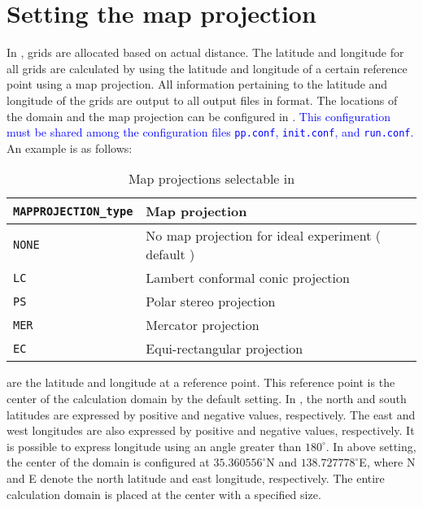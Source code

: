 \section{Setting the map projection} \label{subsec:adv_mapproj}

In \scalerm, grids are allocated based on actual distance. The latitude and longitude for all grids are calculated by using the latitude and longitude of a certain reference point using a map projection. All information pertaining to the latitude and longitude of the grids are output to all output files in \netcdf format. The locations of the domain and the map projection can be configured in . \textcolor{blue}{This configuration must be shared among the configuration files \texttt{pp.conf}, \texttt{init.conf}, and \texttt{run.conf}.} An example is as follows:

\begin{table}[htb]
\begin{center}
\caption{Map projections selectable in \scalerm}
\begin{tabularx}{150mm}{|l|X|} \hline
 \rowcolor[gray]{0.9} \verb|MAPPROJECTION_type| & Map projection\\ \hline
 \verb|NONE| & No map projection for ideal experiment ( default ) \\ \hline
 \verb|LC|   & Lambert conformal conic projection   \\ \hline
 \verb|PS|   & Polar stereo projection           \\ \hline
 \verb|MER|  & Mercator projection               \\ \hline
 \verb|EC|   & Equi-rectangular projection        \\ \hline
\end{tabularx}
\label{tab:map_proj}
\end{center}
\end{table}

 are the latitude and longitude at a reference point. This reference point is the center of the calculation domain by the default setting.
In \scalerm, the north and south latitudes are expressed by positive and negative values, respectively. The east and west longitudes are also expressed by positive and negative values, respectively. It is possible to express longitude using an angle greater than $180^{\circ}$.
In above setting, the center of the domain is configured at $35.360556^{\circ}$N and $138.727778^{\circ}$E, where N and E denote the north latitude and east longitude, respectively. The entire calculation domain is placed at the center with a specified size.

